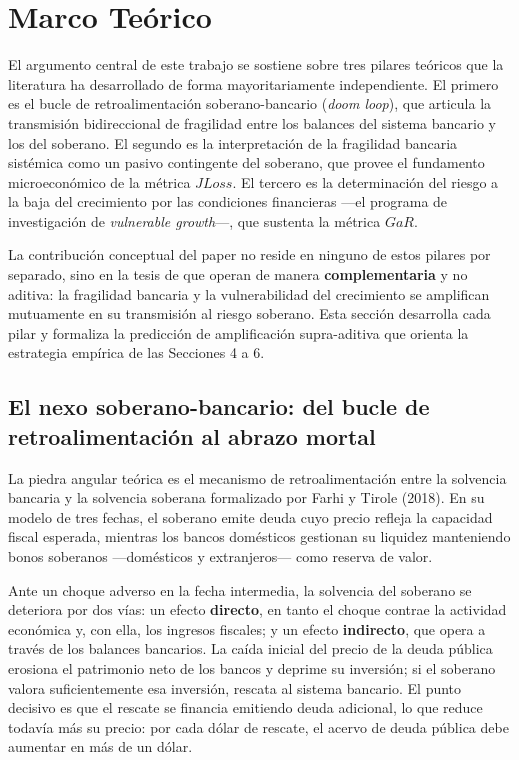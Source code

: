 \documentclass[5p,times,twocolumn,authoryear]{elsarticle}
\begin{document}
\section{Marco Teórico}

El argumento central de este trabajo se sostiene sobre tres pilares teóricos que la literatura ha desarrollado de forma mayoritariamente independiente. El primero es el bucle de retroalimentación soberano-bancario (\textit{doom loop}), que articula la transmisión bidireccional de fragilidad entre los balances del sistema bancario y los del soberano. El segundo es la interpretación de la fragilidad bancaria sistémica como un pasivo contingente del soberano, que provee el fundamento microeconómico de la métrica $JLoss$. El tercero es la determinación del riesgo a la baja del crecimiento por las condiciones financieras —el programa de investigación de \textit{vulnerable growth}—, que sustenta la métrica $GaR$. 

La contribución conceptual del paper no reside en ninguno de estos pilares por separado, sino en la tesis de que operan de manera \textbf{complementaria} y no aditiva: la fragilidad bancaria y la vulnerabilidad del crecimiento se amplifican mutuamente en su transmisión al riesgo soberano. Esta sección desarrolla cada pilar y formaliza la predicción de amplificación supra-aditiva que orienta la estrategia empírica de las Secciones 4 a 6.

\subsection{El nexo soberano-bancario: del bucle de retroalimentación al abrazo mortal}

La piedra angular teórica es el mecanismo de retroalimentación entre la solvencia bancaria y la solvencia soberana formalizado por Farhi y Tirole (2018). En su modelo de tres fechas, el soberano emite deuda cuyo precio refleja la capacidad fiscal esperada, mientras los bancos domésticos gestionan su liquidez manteniendo bonos soberanos —domésticos y extranjeros— como reserva de valor.

Ante un choque adverso en la fecha intermedia, la solvencia del soberano se deteriora por dos vías: un efecto \textbf{directo}, en tanto el choque contrae la actividad económica y, con ella, los ingresos fiscales; y un efecto \textbf{indirecto}, que opera a través de los balances bancarios. La caída inicial del precio de la deuda pública erosiona el patrimonio neto de los bancos y deprime su inversión; si el soberano valora suficientemente esa inversión, rescata al sistema bancario. El punto decisivo es que el rescate se financia emitiendo deuda adicional, lo que reduce todavía más su precio: por cada dólar de rescate, el acervo de deuda pública debe aumentar en más de un dólar.
\end{document}
